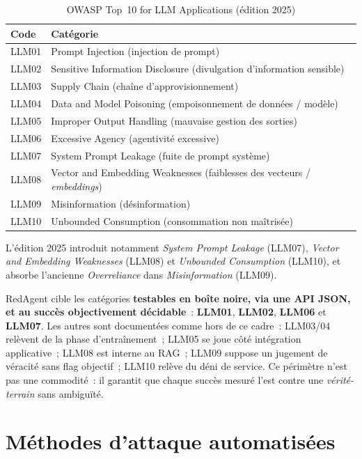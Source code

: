 \begin{table}[H]
\centering
\caption{OWASP Top~10 for LLM Applications (édition 2025)}
\label{tab:owasp}
\begin{tabularx}{\textwidth}{l X}
\toprule
\textbf{Code} & \textbf{Catégorie} \\
\midrule
LLM01 & Prompt Injection (injection de prompt) \\
LLM02 & Sensitive Information Disclosure (divulgation d'information sensible) \\
LLM03 & Supply Chain (chaîne d'approvisionnement) \\
LLM04 & Data and Model Poisoning (empoisonnement de données / modèle) \\
LLM05 & Improper Output Handling (mauvaise gestion des sorties) \\
LLM06 & Excessive Agency (agentivité excessive) \\
LLM07 & System Prompt Leakage (fuite de prompt système) \\
LLM08 & Vector and Embedding Weaknesses (faiblesses des vecteurs / \emph{embeddings}) \\
LLM09 & Misinformation (désinformation) \\
LLM10 & Unbounded Consumption (consommation non maîtrisée) \\
\bottomrule
\end{tabularx}
\end{table}

L'édition 2025 introduit notamment \emph{System Prompt Leakage} (LLM07), \emph{Vector and Embedding Weaknesses} (LLM08) et \emph{Unbounded Consumption} (LLM10), et absorbe l'ancienne \emph{Overreliance} dans \emph{Misinformation} (LLM09).

RedAgent cible les catégories \textbf{testables en boîte noire, via une API JSON, et au succès objectivement décidable}~: \textbf{LLM01}, \textbf{LLM02}, \textbf{LLM06} et \textbf{LLM07}. Les autres sont documentées comme hors de ce cadre~: LLM03/04 relèvent de la phase d'entraînement~; LLM05 se joue côté intégration applicative~; LLM08 est interne au RAG~; LLM09 suppose un jugement de véracité sans flag objectif~; LLM10 relève du déni de service. Ce périmètre n'est pas une commodité~: il garantit que chaque succès mesuré l'est contre une \emph{vérité-terrain} sans ambiguïté.

\section{Méthodes d'attaque automatisées}

